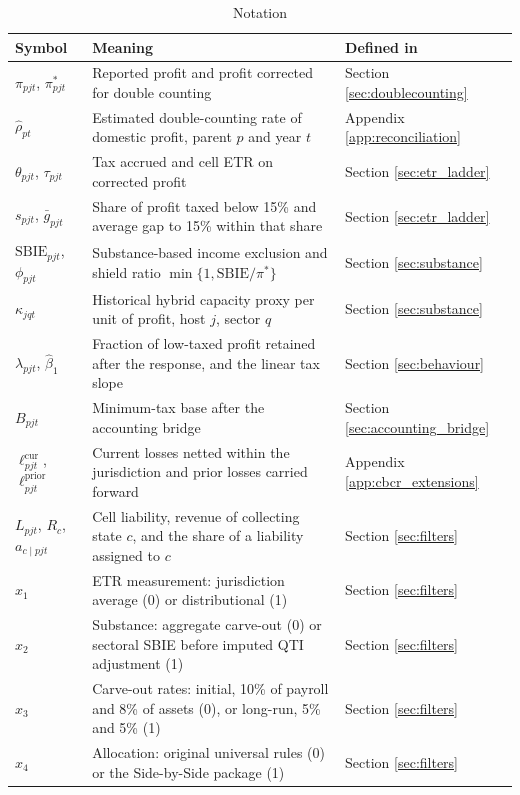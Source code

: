 \documentclass[11pt,a4paper]{article}
\begin{document}
\begin{table}[H]
\centering
\footnotesize
\caption{Notation}\label{tab:app_notation}
\begin{tabularx}{\textwidth}{@{}lXl@{}}
\toprule
Symbol & Meaning & Defined in \\
\midrule
$\pi_{pjt}$, $\pi^{*}_{pjt}$ & Reported profit and profit corrected for double counting & Section \ref{sec:doublecounting} \\
$\hat\rho_{pt}$ & Estimated double-counting rate of domestic profit, parent $p$ and year $t$ & Appendix \ref{app:reconciliation} \\
$\theta_{pjt}$, $\tau_{pjt}$ & Tax accrued and cell ETR on corrected profit & Section \ref{sec:etr_ladder} \\
$s_{pjt}$, $\bar g_{pjt}$ & Share of profit taxed below 15\% and average gap to 15\% within that share & Section \ref{sec:etr_ladder} \\
$\mathrm{SBIE}_{pjt}$, $\phi_{pjt}$ & Substance-based income exclusion and shield ratio $\min\{1,\mathrm{SBIE}/\pi^{*}\}$ & Section \ref{sec:substance} \\
$\kappa_{jqt}$ & Historical hybrid capacity proxy per unit of profit, host $j$, sector $q$ & Section \ref{sec:substance} \\
$\lambda_{pjt}$, $\hat\beta_1$ & Fraction of low-taxed profit retained after the response, and the linear tax slope & Section \ref{sec:behaviour} \\
$B_{pjt}$ & Minimum-tax base after the accounting bridge & Section \ref{sec:accounting_bridge} \\
$\ell^{\mathrm{cur}}_{pjt}$, $\ell^{\mathrm{prior}}_{pjt}$ & Current losses netted within the jurisdiction and prior losses carried forward & Appendix \ref{app:cbcr_extensions} \\
$L_{pjt}$, $R_c$, $a_{c\mid pjt}$ & Cell liability, revenue of collecting state $c$, and the share of a liability assigned to $c$ & Section \ref{sec:filters} \\
$x_1$ & ETR measurement: jurisdiction average (0) or distributional (1) & Section \ref{sec:filters} \\
$x_2$ & Substance: aggregate carve-out (0) or sectoral SBIE before imputed QTI adjustment (1) & Section \ref{sec:filters} \\
$x_3$ & Carve-out rates: initial, 10\% of payroll and 8\% of assets (0), or long-run, 5\% and 5\% (1) & Section \ref{sec:filters} \\
$x_4$ & Allocation: original universal rules (0) or the Side-by-Side package (1) & Section \ref{sec:filters} \\

\end{tabularx}
\end{table}
\end{document}
